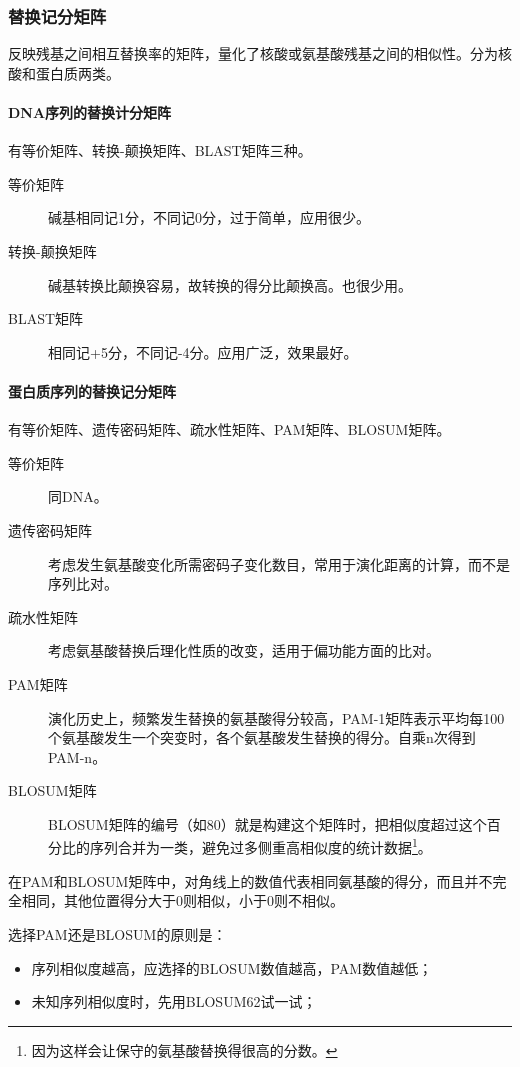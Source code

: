 \subsubsection{替换记分矩阵}

反映残基之间相互替换率的矩阵，量化了核酸或氨基酸残基之间的相似性。分为核酸和蛋白质两类。

\paragraph{DNA序列的替换计分矩阵}

有等价矩阵、转换-颠换矩阵、BLAST矩阵三种。

\begin{description}
	\item[等价矩阵] 碱基相同记1分，不同记0分，过于简单，应用很少。
	\item[转换-颠换矩阵] 碱基转换比颠换容易，故转换的得分比颠换高。也很少用。
	\item[BLAST矩阵] 相同记+5分，不同记-4分。应用广泛，效果最好。
\end{description}


\paragraph{蛋白质序列的替换记分矩阵}

有等价矩阵、遗传密码矩阵、疏水性矩阵、PAM矩阵、BLOSUM矩阵。

\begin{description}
	\item[等价矩阵] 同DNA。
	\item[遗传密码矩阵] 考虑发生氨基酸变化所需密码子变化数目，常用于演化距离的计算，而不是序列比对。
	\item[疏水性矩阵] 考虑氨基酸替换后理化性质的改变，适用于偏功能方面的比对。
	\item[PAM矩阵] 演化历史上，频繁发生替换的氨基酸得分较高，PAM-1矩阵表示平均每100个氨基酸发生一个突变时，各个氨基酸发生替换的得分。自乘n次得到PAM-n。
	\item[BLOSUM矩阵] BLOSUM矩阵的编号（如80）就是构建这个矩阵时，把相似度超过这个百分比的序列合并为一类，避免过多侧重高相似度的统计数据\footnote{因为这样会让保守的氨基酸替换得很高的分数。}。
\end{description}

在PAM和BLOSUM矩阵中，对角线上的数值代表相同氨基酸的得分，而且并不完全相同，其他位置得分大于0则相似，小于0则不相似。

选择PAM还是BLOSUM的原则是：
\begin{itemize}
	\item 序列相似度越高，应选择的BLOSUM数值越高，PAM数值越低；
	\item 未知序列相似度时，先用BLOSUM62试一试；
\end{itemize}

